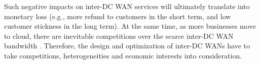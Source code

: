 \documentclass[sigconf]{acmart}
\begin{document}
Such negative impacts on inter-DC WAN services will ultimately translate into monetary loss (e.g., more refund to customers in the short term, and low customer stickness in the long term).
At the same time, as more businesses move to cloud, 
there are inevitable competitions over the scarce inter-DC WAN bandwidth  \cite{swan,Guaranteeings,calendaring}.
Therefore, the design and optimization of inter-DC WANs have to take competitions, heterogeneities and economic interests into consideration.
\end{document}
